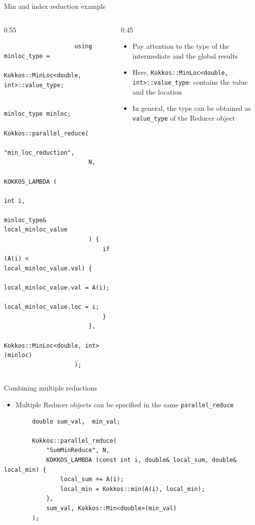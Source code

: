 \documentclass[
    aspectratio=169,
]{beamer}
\begin{document}
\begin{frame}[fragile]{Min and index reduction example}
    \begin{columns}
        \begin{column}{0.55\linewidth}
            \begin{verbatim}
                    using minloc_type =
                        Kokkos::MinLoc<double, int>::value_type;

                    minloc_type minloc;
                    Kokkos::parallel_reduce(
                        "min_loc_reduction",
                        N,
                        KOKKOS_LAMBDA (
                            int i,
                            minloc_type& local_minloc_value
                        ) {
                            if (A(i) < local_minloc_value.val) {
                                local_minloc_value.val = A(i);
                                local_minloc_value.loc = i;
                            }
                        },
                        Kokkos::MinLoc<double, int>(minloc)
                    );
                \end{verbatim}
        \end{column}
        \begin{column}{0.45\linewidth}
            \begin{itemize}
                \item Pay attention to the type of the intermediate and the global results
                \item Here, \texttt{Kokkos::MinLoc<double, int>::value\_type}: contains the value and the location
                \item In general, the type can be obtained as \texttt{value\_type} of the Reducer object
            \end{itemize}
        \end{column}
    \end{columns}
\end{frame}

\begin{frame}[fragile]{Combining multiple reductions}
    \begin{itemize}
        \item Multiple Reducer objects can be specified in the same \texttt{parallel\_reduce}
    \end{itemize}
    \begin{verbatim}
        double sum_val,  min_val;

        Kokkos::parallel_reduce(
            "SumMinReduce", N,
            KOKKOS_LAMBDA (const int i, double& local_sum, double& local_min) {
                local_sum += A(i);
                local_min = Kokkos::min(A(i), local_min);
            },
            sum_val, Kokkos::Min<double>(min_val)
        );
    \end{verbatim}
\end{frame}
\end{document}
